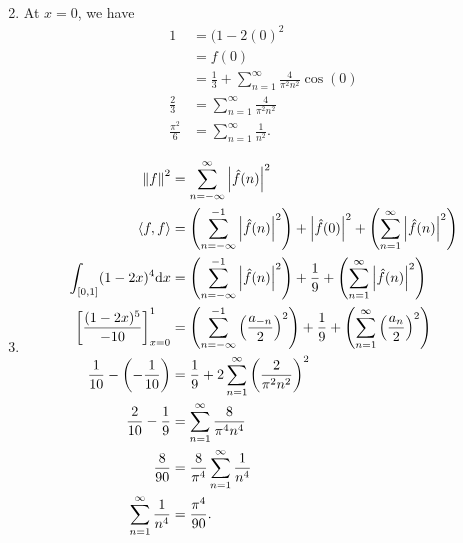 \documentclass{article}
\begin{document}
\begin{enumerate}[label=(\alph*)]
\begin{align*}
    \end{align*}
    \item At $x=0$, we have \begin{align*}
            1 &= (1-2(0)^2 \\
              &= f(0) \\
              &= \frac{1}{3} + \sum_{n=1}^\infty \frac{4}{\pi^2n^2} \cos(0) \\
            \frac{2}{3} &= \sum_{n=1}^\infty \frac{4}{\pi^2n^2} \\
            \frac{\pi^2}{6} &= \sum_{n=1}^\infty \frac{1}{n^2}.
    \end{align*}
\item \begin{align*}
        \left\lVert f\right\rVert^2 &= \sum_{n=-\infty}^\infty \left\lvert \hat{f}(n) \right\rvert^2 \\
        \left\langle f,f \right\rangle &= \left( \sum_{n=-\infty}^{-1} \left\lvert \hat{f}(n) \right\rvert^2 \right) + \left\lvert \hat{f}(0) \right\rvert^2 + \left( \sum_{n=1}^{\infty} \left\lvert \hat{f}(n) \right\rvert^2 \right) \\
        \int_{[0,1]} (1-2x)^4 \mathrm{d} x &= \left( \sum_{n=-\infty}^{-1} \left\lvert \hat{f}(n) \right\rvert^2 \right) + \frac{1}{9} + \left( \sum_{n=1}^{\infty} \left\lvert \hat{f}(n) \right\rvert^2 \right) \\
        \left[ \frac{(1-2x)^5}{-10} \right]_{x=0}^1 &= \left( \sum_{n=-\infty}^{-1} \left( \frac{a_{-n}}{2} \right)^2 \right) + \frac{1}{9} + \left( \sum_{n=1}^{\infty} \left(\frac{a_n}{2}\right)^2 \right) \\
        \frac{1}{10} - \left( - \frac{1}{10} \right) &= \frac{1}{9} + 2 \sum_{n=1}^{\infty} \left( \frac{2}{\pi^2n^2} \right)^2 \\
        \frac{2}{10} - \frac{1}{9} &= \sum_{n=1}^{\infty} \frac{8}{\pi^4n^4} \\
        \frac{8}{90} &= \frac{8}{\pi^4} \sum_{n=1}^{\infty} \frac{1}{n^4} \\
        \sum_{n=1}^{\infty} \frac{1}{n^4} &= \frac{\pi^4}{90}.
\end{align*}
\end{enumerate}
\end{document}
